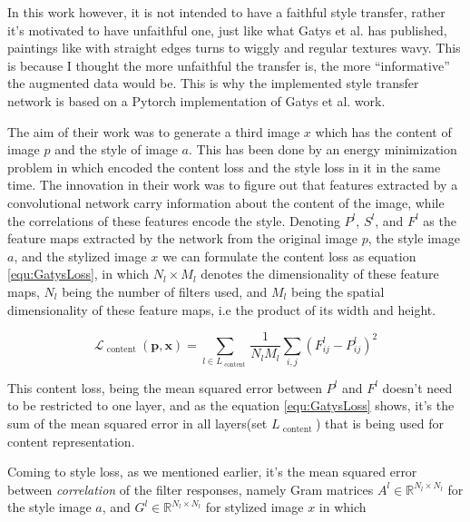 \documentclass[12pt, a4paper]{scrartcl}
\begin{document}
In this work however, it is not intended to have a faithful style transfer, rather it's motivated to have unfaithful one, just like what Gatys et al. has published, paintings like with straight edges turns to wiggly and regular textures wavy\cite{Luan2017}. This is because I thought the more unfaithful the transfer is, the more ``informative'' the augmented data would be. This is why the implemented style transfer network is based on a Pytorch implementation of Gatys et al. work. 

The aim of their work was to generate a third image $x$ which has the content of image $p$ and the style of image $a$. This has been done by an energy minimization problem in which encoded the content loss and the style loss in it in the same time. The innovation in their work was to figure out that features extracted by a convolutional network carry information about the content of the image, while the correlations of these features encode the style\citep{Ruder}. Denoting $P^l$, $S^l$, and $F^l$ as the feature maps extracted by the network from the original image $p$, the style image $a$, and the stylized image $x$ we can formulate the content loss as equation \ref{equ:GatysLoss}, in which $N _ { l } \times M _ { l }$ denotes the dimensionality of these feature maps, $N _ { l }$ being the number of filters used, and  $M _ { l }$ being the spatial dimensionality of these feature maps, i.e the product of its width and height.

\begin{equation} \label{equ:GatysLoss}
\mathcal { L } _ { \text { content } } ( \boldsymbol { p } , \boldsymbol { x } ) = \sum _ { l \in L _ { \text { content } } } \frac { 1 } { N _ { l } M _ { l } } \sum _ { i , j } \left( F _ { i j } ^ { l } - P _ { i j } ^ { l } \right) ^ { 2 }
\end{equation}

This content loss, being the mean squared error between $P^l$ and $F^l$ doesn't need to be restricted to one layer, and as the equation \ref{equ:GatysLoss} shows, it's the sum of the mean squared error in all layers(set ${ L } _ { \text { content } } $) that is being used for content representation.

Coming to style loss, as we mentioned earlier, it's the mean squared error between \emph{correlation} of the filter responses, namely Gram matrices $A ^ { l } \in \mathbb { R } ^ { N _ { l } \times N _ { l } }$ for the style image $a$, and $G ^ { l } \in \mathbb { R } ^ { N _ { l } \times N _ { l } }$ for stylized image $x$ in which
\end{document}
